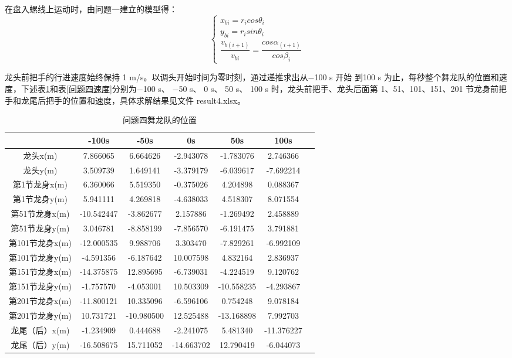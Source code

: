 \documentclass[withoutpreface,bwprint]{cumcmthesis} %
\begin{document}
	在盘入螺线上运动时，由问题一建立的模型得：
	\begin{equation}
		\begin{cases}
			x_{bi}=r_icos\theta_i\\
			y_{bi}=r_isin\theta_i\\
			\dfrac{v_{b(i+1)}}{v_{bi}}=\dfrac{cos\alpha_{(i+1)}}{cos\beta_i}
		\end{cases}
	\end{equation}
	
	龙头前把手的行进速度始终保持 1 m/s。以调头开始时间为零时刻，通过递推求出从−100 s 开始
	到100 s 为止，每秒整个舞龙队的位置和速度，下述表\ref{问题四位置}和表\ref{问题四速度}分别为−100 s、 −50 s、 0 s、 50 s、 100 s 时，龙头前把手、龙头后面第 1、51、101、151、201 节龙身前把手和龙尾后把手的位置和速度，具体求解结果见文件 result4.xlsx。
	\begin{table}[H]
		\centering
		\setlength{\tabcolsep}{9pt}
		\caption{问题四舞龙队的位置} 
		\label{问题四位置} 
		\setlength\extrarowheight{-3pt}
		\small
		\begin{tabular}{|c|c|c|c|c|c|c|}
			\hline
			& -100s& -50s & 0s & 50s & 100s \\ \hline
			龙头x(m) &7.866065 &6.664626&-2.943078&-1.783076&2.746366 \\ \hline
			龙头y(m) & 3.509739& 1.649141 &-3.379179&-6.039617&-7.692214 \\ \hline
			第1节龙身x(m)&6.360066& 5.519350 &-0.375026&4.204898&0.088367\\ \hline
			第1节龙身y(m)& 5.941111& 4.269818& -4.638033&4.518307&8.071554\\ \hline
			第51节龙身x(m) & -10.542447&-3.862677& 2.157886&-1.269492 &2.458889 \\ \hline
			第51节龙身y(m) & 3.046781&-8.858199&-7.856570& -6.191475&3.791881 \\ \hline
			第101节龙身x(m)& -12.000535&9.988706&3.303470&-7.829261 &-6.992109  \\ \hline
			第101节龙身y(m)& -4.591356&-6.187642&10.007598&4.832164&2.836937  \\ \hline
			第151节龙身x(m)& -14.375875&12.895695&-6.739031&-4.224519&9.120762  \\ \hline
			第151节龙身y(m)& -1.757570&-4.053001& 10.503309& -10.558235&-4.293867  \\ \hline
			第201节龙身x(m)&-11.800121&10.335096&-6.596106 &0.754248&9.078184  \\ \hline
			第201节龙身y(m)&10.731721 &-10.980500&12.525488& -13.168898&7.992703  \\ \hline
			龙尾（后）x(m)& -1.234909& 0.444688&-2.241075&5.481340&-11.376227 \\ \hline
			龙尾（后）y(m)&-16.508675 &15.711052 &-14.663702&12.790419&-6.044073 \\ \hline
		\end{tabular}
	\end{table}
\end{document}
